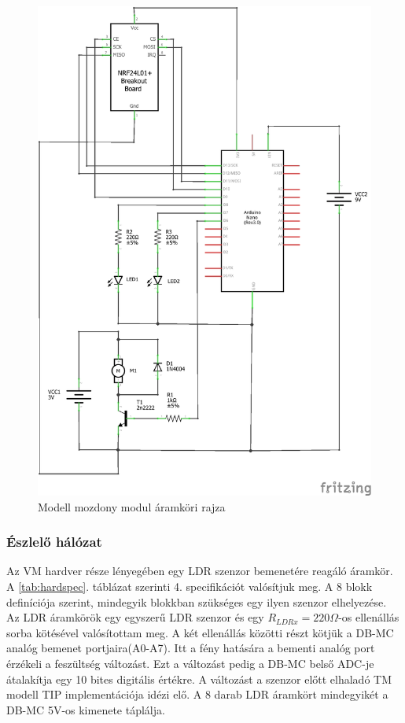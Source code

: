 \documentclass[a4paper,12pt]{article}
\begin{document}
\begin{figure}[!htp]
	\includegraphics[width=0.9\linewidth]{images/circuit_train_module.png}
    \caption[Modell mozdony modul áramköri rajza]{Modell mozdony modul áramköri rajza}
	\label{fig:circuit_train_module}
\end{figure}

\newpage



\subsubsection{Észlelő hálózat}
Az VM hardver része lényegében egy LDR szenzor bemenetére reagáló áramkör.
A \ref{tab:hardspec}. táblázat szerinti 4. specifikációt valósítjuk meg.
A 8 blokk definíciója szerint, mindegyik blokkban szükséges egy ilyen szenzor elhelyezése.
Az LDR áramkörök egy egyszerű LDR szenzor és  egy $R_{LDRx} = 220\Omega$-os ellenállás sorba kötésével valósítottam meg.
A két ellenállás közötti részt kötjük a DB-MC analóg bemenet portjaira(A0-A7). Itt a fény hatására a bementi analóg port érzékeli a feszültség változást.
Ezt a változást pedig a DB-MC belső ADC-je átalakítja egy 10 bites digitális értékre.
A változást a szenzor előtt elhaladó TM modell TIP implementációja idézi elő.
A 8 darab LDR áramkört mindegyikét a DB-MC 5V-os kimenete táplálja.
\end{document}
